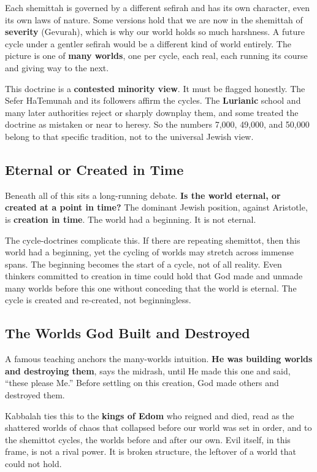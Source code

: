 Each shemittah is governed by a different sefirah and has its own character, even
its own laws of nature. Some versions hold that we are now in the shemittah of
\textbf{severity} (Gevurah), which is why our world holds so much harshness. A
future cycle under a gentler sefirah would be a different kind of world entirely.
The picture is one of \textbf{many worlds}, one per cycle, each real, each running
its course and giving way to the next.

This doctrine is a \textbf{contested minority view}. It must be flagged honestly.
The Sefer HaTemunah and its followers affirm the cycles. The \textbf{Lurianic}
school and many later authorities reject or sharply downplay them, and some treated
the doctrine as mistaken or near to heresy. So the numbers 7,000, 49,000, and
50,000 belong to that specific tradition, not to the universal Jewish view.

\subsection{Eternal or Created in Time}

Beneath all of this sits a long-running debate. \textbf{Is the world eternal, or
created at a point in time?} The dominant Jewish position, against Aristotle, is
\textbf{creation in time}. The world had a beginning. It is not eternal.

The cycle-doctrines complicate this. If there are repeating shemittot, then this
world had a beginning, yet the cycling of worlds may stretch across immense spans.
The beginning becomes the start of a cycle, not of all reality. Even thinkers
committed to creation in time could hold that God made and unmade many worlds
before this one without conceding that the world is eternal. The cycle is created
and re-created, not beginningless.

\subsection{The Worlds God Built and Destroyed}

A famous teaching anchors the many-worlds intuition. \textbf{He was building
worlds and destroying them}, says the midrash, until He made this one and said,
\enquote{these please Me.} Before settling on this creation, God made others and
destroyed them.

Kabbalah ties this to the \textbf{kings of Edom} who reigned and died, read as the
shattered worlds of chaos that collapsed before our world was set in order, and to
the shemittot cycles, the worlds before and after our own. Evil itself, in this
frame, is not a rival power. It is broken structure, the leftover of a world that
could not hold.

